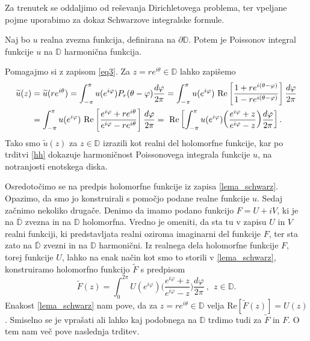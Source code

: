 \documentclass[mat1, tisk]{fmfdelo}
\begin{document}
    Za trenutek se oddaljimo od reševanja Dirichletovega problema, ter vpeljane pojme uporabimo za dokaz Schwarzove integralske formule.

     \begin{lema}
        \label{realnidel}
        Naj bo $u$ realna zvezna funkcija, definirana na $\partial \mathbb{D}$. Potem je Poissonov integral funkcije $u$ na $\mathbb{D}$ harmonična funkcija.
     \end{lema}
     \begin{dokaz}
        Pomagajmo si z zapisom \eqref{eq3}. Za $z = re^{i\theta} \in \mathbb{D}$ lahko zapišemo
            \begin{align}
                \label{lema_schwarz}
                \widetilde{u}(z) &= \widetilde{u}(r e^{i \theta}) = \int_{-\pi}^{\pi}{u(e^{i \varphi}) P_r(\theta - \varphi)\frac{d \varphi}{2 \pi}} = \int_{-\pi}^{\pi}{u(e^{i \varphi})~\text{Re}\left[\frac{1+re^{i(\theta - \varphi)}}{1-re^{i(\theta - \varphi)}}\right]\frac{d \varphi}{2 \pi}} \notag \\
                &= \int_{-\pi}^{\pi}{u(e^{i \varphi})~\text{Re}\left[\frac{e^{i\varphi}+re^{i\theta}}{e^{i\varphi}-re^{i\theta}}\right]\frac{d \varphi}{2 \pi}}=~\text{Re}\left[\int_{-\pi}^{\pi}{u(e^{i \varphi})\bigg(\frac{e^{i\varphi}+z}{e^{i\varphi}-z}\bigg)\frac{d \varphi}{2 \pi}}\right].
            \end{align}
        Tako smo $\widetilde{u}(z)$ za $z \in \mathbb{D}$ izrazili kot realni del holomorfne funkcije, kar po trditvi \ref{hh} dokazuje harmoničnost Poissonovega integrala funkcije $u$, na notranjosti enotskega diska.
     \end{dokaz}

     Osredotočimo se na predpis holomorfne funkcije iz zapisa \eqref{lema_schwarz}. Opazimo, da smo jo konstruirali s pomočjo podane realne funkcije $u$. 
     Sedaj začnimo nekoliko drugače. Denimo da imamo podano funkcijo $F = U + iV$, ki je na $\overline{\mathbb{D}}$ zvezna in na $\mathbb{D}$ holomorfna. Vredno je omeniti, da sta tu v zapisu $U$ in $V$ realni funkciji, ki predstavljata realni oziroma imaginarni del funkcije $F$, ter sta zato na $\overline{\mathbb{D}}$ zvezni in na $\mathbb{D}$ harmonični.
     Iz realnega dela holomorfne funkcije $F$, torej funkcije $U$, lahko na enak način kot smo to storili v \eqref{lema_schwarz}, konstruiramo holomorfno funkcijo $\widetilde{F}$ s predpisom
     \begin{equation}
        \label{priprav_schwarz}
        \widetilde{F}(z) = \int_{0}^{2 \pi}{U(e^{i \varphi})\bigg(\frac{e^{i\varphi}+z}{e^{i\varphi}-z}\bigg)\frac{d \varphi}{2 \pi}}~,~~z \in \mathbb{D}.
    \end{equation}
    Enakost \eqref{lema_schwarz} nam pove, da za $z = r e^{i\theta}\in \mathbb{D}$ velja $\text{Re}[\widetilde{F}(z)] = U(z)$. Smiselno se je vprašati ali lahko kaj podobnega na $\mathbb{D}$ trdimo tudi za $\widetilde{F}$ in $F$. 
    O tem nam več pove naslednja trditev. 
\end{document}
